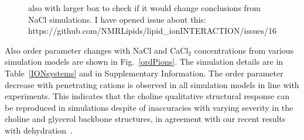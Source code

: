 \documentclass[pre,aps,floatfix,authordate1-4,twocolumn]{revtex4-1}
\begin{document}
\begin{figure}[]
{also with larger box to check if it would change conclusions from NaCl simulations.
I have opened issue about this: \\
https://github.com/NMRLipids/lipid\_ionINTERACTION/issues/16} \\
\end{figure}

Also order parameter changes with NaCl and CaCl$_2$ concentrations from various simulation models are shown in Fig.~\ref{ordPions}. 
The simulation details are in Table~\ref{IONsystems} and in Supplementary Information. 
The order parameter decrease with penetrating cations is observed in all simulation models in line with experiments.
This indicates that the choline qualitative structural response can be reproduced in simulations despite of 
inaccuracies with varying severity in the choline and glycerol backbone structures, in agreement
with our recent results with dehydration~\cite{botan15}.

\end{document}
